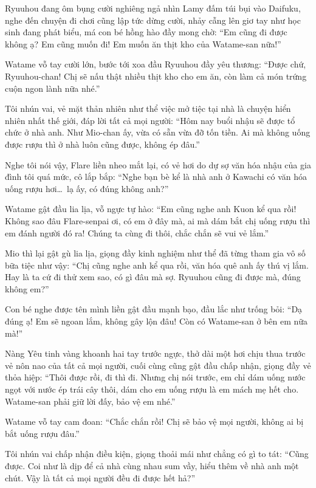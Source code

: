 \documentclass[../main.tex]{subfiles}
\begin{document}
Ryuuhou đang ôm bụng cười nghiêng ngả nhìn Lamy đấm túi bụi vào Daifuku, nghe đến chuyện đi chơi cũng lập tức dừng cười, nhảy cẫng lên giơ tay như học sinh đang phát biểu, má con bé hồng hào đầy mong chờ: ``Em cũng đi được không ạ? Em cũng muốn đi! Em muốn ăn thịt kho của Watame-san nữa!''

Watame vỗ tay cười lớn, bước tới xoa đầu Ryuuhou đầy yêu thương: ``Được chứ, Ryuuhou-chan! Chị sẽ nấu thật nhiều thịt kho cho em ăn, còn làm cả món trứng cuộn ngon lành nữa nhé.''

Tôi nhún vai, vẻ mặt thản nhiên như thể việc mở tiệc tại nhà là chuyện hiển nhiên nhất thế giới, đáp lời tất cả mọi người: ``Hôm nay buổi nhậu sẽ được tổ chức ở nhà anh. Như Mio-chan ấy, vừa có sẵn vừa đỡ tốn tiền. Ai mà không uống được rượu thì ở nhà luôn cũng được, không ép đâu.''

Nghe tôi nói vậy, Flare liền nheo mắt lại, có vẻ hơi do dự sợ văn hóa nhậu của gia đình tôi quá mức, cô lắp bắp: ``Nghe bạn bè kể là nhà anh ở Kawachi có văn hóa uống rượu hơi\dots\ lạ ấy, có đúng không anh?''

Watame gật đầu lia lịa, vỗ ngực tự hào: ``Em cũng nghe anh Kuon kể qua rồi! Không sao đâu Flare-senpai ơi, có em ở đây mà, ai mà dám bắt chị uống rượu thì em đánh người đó ra! Chúng ta cùng đi thôi, chắc chắn sẽ vui vẻ lắm.''

Mio thì lại gật gù lia lịa, giọng đầy kinh nghiệm như thể đã từng tham gia vô số bữa tiệc như vậy: ``Chị cũng nghe anh kể qua rồi, văn hóa quê anh ấy thú vị lắm. Hay là ta cứ đi thử xem sao, có gì đâu mà sợ. Ryuuhou cũng đi được mà, đúng không em?''

Con bé nghe được tên mình liền gật đầu mạnh bạo, đầu lắc như trống bỏi: ``Dạ đúng ạ! Em sẽ ngoan lắm, không gây lộn đâu! Còn có Watame-san ở bên em nữa mà!''

Nàng Yêu tinh vàng khoanh hai tay trước ngực, thở dài một hơi chịu thua trước vẻ nôn nao của tất cả mọi người, cuối cùng cũng gật đầu chấp nhận, giọng đầy vẻ thỏa hiệp: ``Thôi được rồi, đi thì đi. Nhưng chị nói trước, em chỉ dám uống nước ngọt với nước ép trái cây thôi, dám cho em uống rượu là em mách mẹ hết cho. Watame-san phải giữ lời đấy, bảo vệ em nhé.''

Watame vỗ tay cam đoan: ``Chắc chắn rồi! Chị sẽ bảo vệ mọi người, không ai bị bắt uống rượu đâu.''

Tôi nhún vai chấp nhận điều kiện, giọng thoải mái như chẳng có gì to tát: ``Cũng được. Coi như là dịp để cả nhà cùng nhau sum vầy, hiểu thêm về nhà anh một chút. Vậy là tất cả mọi người đều đi được hết hả?''
\end{document}
